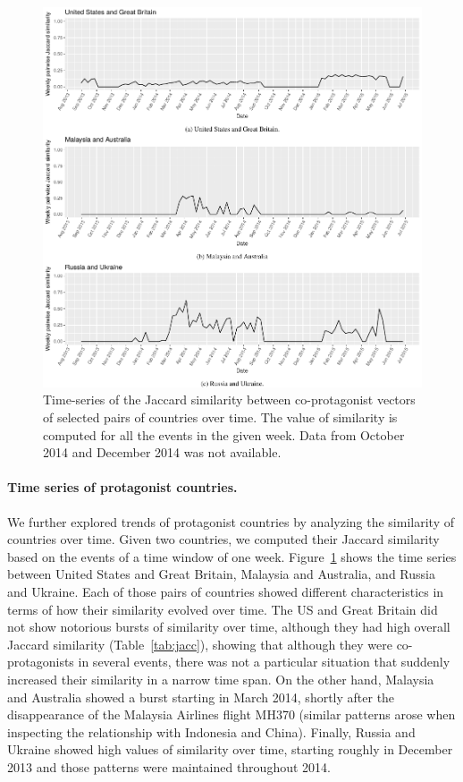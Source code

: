 \begin{figure}
    \centering
    \includegraphics[width=\textwidth]{figures/geopolitical/jaccard_time.pdf}
    \caption[Time-series of the Jaccard similarity between co-protagonist
  vectors]{Time-series of the Jaccard similarity between co-protagonist vectors
  of selected pairs of countries over time. The value of similarity is computed
  for all the events in the given week. Data from October 2014 and December 2014
  was not available.}\label{fig:time-series}
\end{figure}

\paragraph{Time series of protagonist countries.}
We further explored trends of protagonist countries by analyzing the similarity
of countries over time. 
%
Given two countries, we computed their Jaccard similarity based on the events of
a time window of one week. 
%
Figure~\ref{fig:time-series} shows the time series between United States and
Great Britain, Malaysia and Australia, and Russia and Ukraine. 
%
Each of those pairs of countries showed different characteristics in terms of
how their similarity evolved over time. 
%
The US and Great Britain did not show notorious bursts of similarity over time,
although they had high overall Jaccard similarity (Table~\ref{tab:jacc}),
showing that although they were co-protagonists in several events, there was not
a particular situation that suddenly increased their similarity in a narrow time
span. 
%
On the other hand, Malaysia and Australia showed a burst starting in March 2014,
shortly after the disappearance of the Malaysia Airlines flight MH370 (similar
patterns arose when inspecting the relationship with Indonesia and China).
%
Finally, Russia and Ukraine showed high values of similarity over time, starting
roughly in December 2013 and those patterns were maintained throughout 2014.\\



